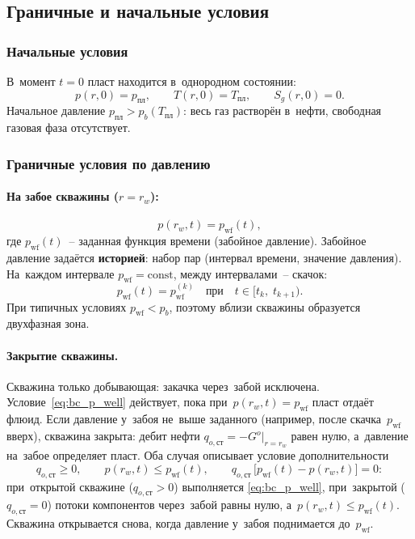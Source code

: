 \documentclass[12pt,a4paper]{article}
\newcommand{\rw}{r_w}
\newcommand{\ppl}{p_{\text{пл}}}
\newcommand{\pwf}{p_{\mathrm{wf}}}
\newcommand{\pb}{p_b}
\newcommand{\Tpl}{T_{\text{пл}}}
\begin{document}
\subsection{Граничные и начальные условия}\label{ssec:bc_ic}

\subsubsection{Начальные условия}\label{sssec:ic}

В~момент $t = 0$ пласт находится в~однородном состоянии:
\begin{equation}\label{eq:ic}
  p(r, 0) = \ppl, \qquad T(r, 0) = \Tpl, \qquad S_g(r, 0) = 0.
\end{equation}
Начальное давление $\ppl > \pb(\Tpl)$: весь газ растворён в~нефти,
свободная газовая фаза отсутствует.


\subsubsection{Граничные условия по давлению}\label{sssec:bc_p}

\paragraph{На забое скважины ($r = \rw$):}
\begin{equation}\label{eq:bc_p_well}
  p(\rw, t) = \pwf(t),
\end{equation}
где $\pwf(t)$~-- заданная функция времени (забойное давление).
Забойное давление задаётся \textbf{историей}: набор пар
(интервал времени, значение давления). На~каждом интервале
$\pwf = \mathrm{const}$, между интервалами~-- скачок:
\begin{equation}\label{eq:pwf_history}
  \pwf(t) = \pwf^{(k)} \quad \text{при}\quad t \in [t_k,\; t_{k+1}).
\end{equation}
При типичных условиях $\pwf < \pb$, поэтому вблизи скважины
образуется двухфазная зона.

\paragraph{Закрытие скважины.}
Скважина только добывающая: закачка через~забой исключена.
Условие~\eqref{eq:bc_p_well} действует, пока при~$p(\rw, t) = \pwf$
пласт отдаёт флюид. Если давление у~забоя не~выше заданного
(например, после скачка~$\pwf$ вверх), скважина закрыта: дебит
нефти $q_{o,\text{ст}} = -G^{o}\big|_{r = \rw}$ равен нулю, а~давление
на~забое определяет пласт. Оба случая описывает условие
дополнительности
\begin{equation}\label{eq:bc_pwf_shutin}
  q_{o,\text{ст}} \ge 0, \qquad
  p(\rw, t) \le \pwf(t), \qquad
  q_{o,\text{ст}}\,\bigl[\pwf(t) - p(\rw, t)\bigr] = 0:
\end{equation}
при~открытой скважине ($q_{o,\text{ст}} > 0$) выполняется
\eqref{eq:bc_p_well}, при~закрытой ($q_{o,\text{ст}} = 0$) потоки
компонентов через~забой равны нулю, а~$p(\rw, t) \le \pwf(t)$.
Скважина открывается снова, когда давление у~забоя поднимается
до~$\pwf$.
\end{document}
